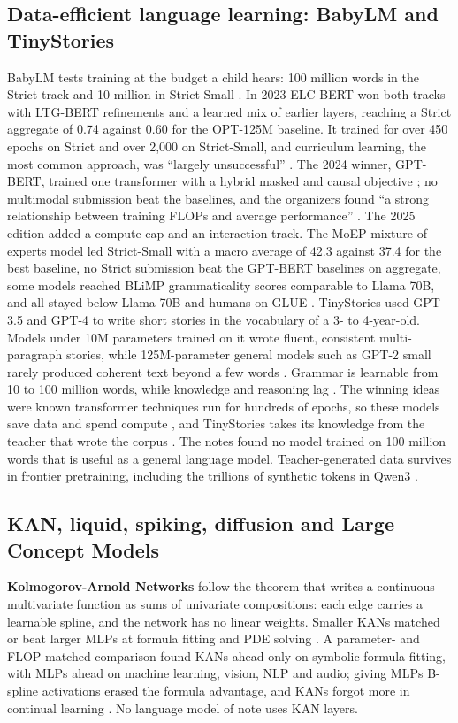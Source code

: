 \subsection{Data-efficient language learning: BabyLM and TinyStories}
BabyLM tests training at the budget a child hears: 100 million words in the Strict track and 10 million in Strict-Small \cite{post81}. In 2023 ELC-BERT won both tracks with LTG-BERT refinements and a learned mix of earlier layers, reaching a Strict aggregate of 0.74 against 0.60 for the OPT-125M baseline. It trained for over 450 epochs on Strict and over 2,000 on Strict-Small, and curriculum learning, the most common approach, was ``largely unsuccessful'' \cite{post81}. The 2024 winner, GPT-BERT, trained one transformer with a hybrid masked and causal objective \cite{post87}; no multimodal submission beat the baselines, and the organizers found ``a strong relationship between training FLOPs and average performance'' \cite{post82}. The 2025 edition added a compute cap and an interaction track. The MoEP mixture-of-experts model led Strict-Small with a macro average of 42.3 against 37.4 for the best baseline, no Strict submission beat the GPT-BERT baselines on aggregate, some models reached BLiMP grammaticality scores comparable to Llama 70B, and all stayed below Llama 70B and humans on GLUE \cite{post88}. TinyStories used GPT-3.5 and GPT-4 to write short stories in the vocabulary of a 3- to 4-year-old. Models under 10M parameters trained on it wrote fluent, consistent multi-paragraph stories, while 125M-parameter general models such as GPT-2 small rarely produced coherent text beyond a few words \cite{post89}. Grammar is learnable from 10 to 100 million words, while knowledge and reasoning lag \cite{post88}. The winning ideas were known transformer techniques run for hundreds of epochs, so these models save data and spend compute \cite{post81}, and TinyStories takes its knowledge from the teacher that wrote the corpus \cite{post89}. The notes found no model trained on 100 million words that is useful as a general language model. Teacher-generated data survives in frontier pretraining, including the trillions of synthetic tokens in Qwen3 \cite{post85}.

\subsection{KAN, liquid, spiking, diffusion and Large Concept Models}
\textbf{Kolmogorov-Arnold Networks} follow the theorem that writes a continuous multivariate function as sums of univariate compositions: each edge carries a learnable spline, and the network has no linear weights. Smaller KANs matched or beat larger MLPs at formula fitting and PDE solving \cite{post94}. A parameter- and FLOP-matched comparison found KANs ahead only on symbolic formula fitting, with MLPs ahead on machine learning, vision, NLP and audio; giving MLPs B-spline activations erased the formula advantage, and KANs forgot more in continual learning \cite{post95}. No language model of note uses KAN layers.

